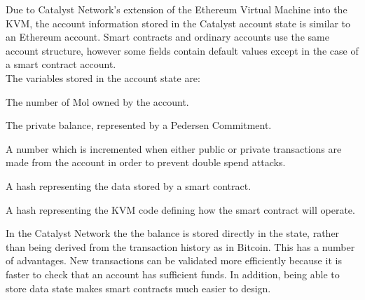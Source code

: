 Due to Catalyst Network’s extension of the Ethereum Virtual Machine into the KVM, the account information stored in the Catalyst account state is similar to an Ethereum account. Smart contracts and ordinary accounts use the same account structure, however some fields contain default values except in the case of a smart contract account. \\

The variables stored in the account state are:

\begin{description}[labelwidth=2cm, leftmargin=!]
\item [Balance] The number of Mol owned by the account.
\item [Commitment] The private balance, represented by a Pedersen Commitment.
\item [Nonce] A number which is incremented when either public or private transactions are made from the account in order to prevent double spend attacks.
\item [StorageRoot] A hash representing the data stored by a smart contract.
\item [CodeHash] A hash representing the KVM code defining how the smart contract will operate.
\end{description}
\vspace{0.75em}
In the Catalyst Network the the balance is stored directly in the state, rather than being derived from the transaction history as in Bitcoin. This has a number of advantages. New transactions can be validated more efficiently because it is faster to check that an account has sufficient funds. In addition, being able to store data state makes smart contracts much easier to design.
